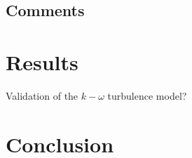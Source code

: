 \subsection{Comments}
%
%
%
\section{Results}
%
Validation of the $k-\omega$ turbulence model?
%
\section{Conclusion}
%

%
%
